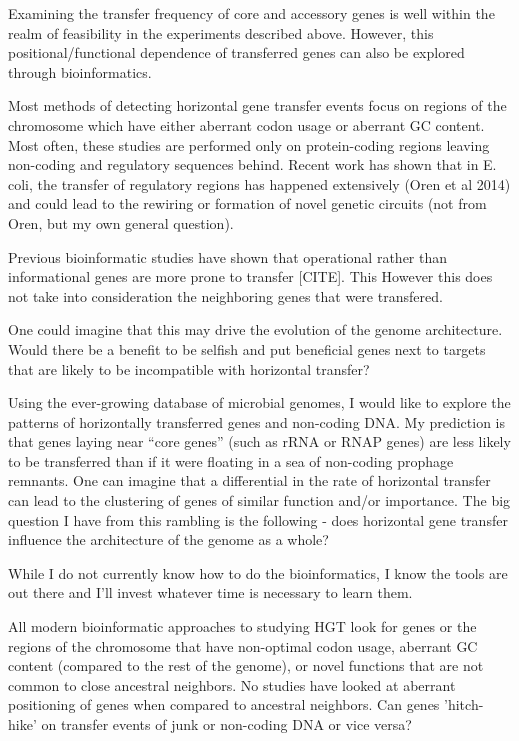 Examining the transfer frequency of core and accessory genes is well within the
realm of feasibility in the experiments described above. However, this
positional/functional dependence of transferred genes can also be explored
through bioinformatics. 

Most methods of detecting horizontal gene transfer events focus on regions of
the chromosome which have either aberrant codon usage or aberrant GC content.
Most often, these studies are performed only on protein-coding regions leaving
non-coding and regulatory sequences behind. Recent work has shown that in E.
coli, the transfer of regulatory regions has happened extensively (Oren et al
2014) and could lead to the rewiring or formation of novel genetic circuits (not
from Oren, but my own general question). 

Previous bioinformatic studies have shown that operational rather than
informational genes are more prone to transfer [CITE]. This However this does
not take into consideration the neighboring genes that were transfered.

One could imagine that this may drive the evolution of the genome architecture.
Would there be a benefit to be selfish and put beneficial genes next to targets
that are likely to be incompatible with horizontal transfer?

Using the ever-growing database of microbial genomes, I would like to explore
the patterns of horizontally transferred genes and non-coding DNA. My prediction
is that genes laying near “core genes” (such as rRNA or RNAP genes) are less
likely to be transferred than if it were floating in a sea of non-coding
prophage remnants. One can imagine that a differential in the rate of horizontal
transfer can lead to the clustering of genes of similar function and/or
importance.  The big question I have  from this rambling is the following - does
horizontal gene transfer influence the architecture of the genome as a whole?

While I do not currently know how to do the bioinformatics, I know the tools are
out there and I’ll invest whatever time is necessary to learn them. 

All modern bioinformatic approaches to studying HGT look for genes or the
regions of the chromosome that have non-optimal codon usage, aberrant GC content
(compared to the rest of the genome), or novel functions that are not common to
close ancestral neighbors. No studies have looked at aberrant positioning of
genes when compared to ancestral neighbors. Can genes 'hitch-hike' on transfer
events of junk or non-coding DNA or vice versa? 

